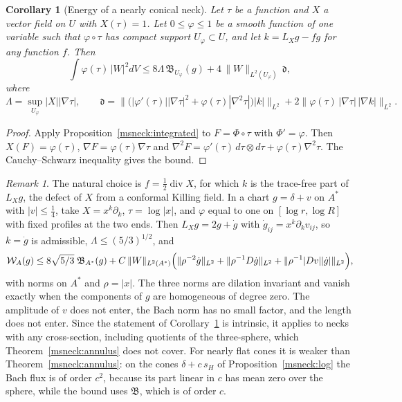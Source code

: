 \documentclass[11pt]{article}
\numberwithin{equation}{section}
\newtheorem{corollary}[theorem]{Corollary}
\theoremstyle{definition}
\theoremstyle{remark}
\newtheorem{remark}[theorem]{Remark}
\begin{document}
\begin{corollary}[Energy of a nearly conical neck]\label{msneck:neck}
Let \(\tau\) be a function and \(X\) a vector field on \(U\) with
\(X(\tau)=1\). Let \(0\le\varphi\le1\) be a smooth function of one
variable such that \(\varphi\circ\tau\) has compact support
\(U_\varphi\subset U\), and let \(k=L_Xg-fg\) for any function \(f\). Then
\[
 \int\varphi(\tau)\,|W|^2dV\le8\Lambda\,\mathfrak B_{U_\varphi}(g)
 +4\,\|W\|_{L^2(U_\varphi)}\,\mathfrak d,
\]
where
\[
 \Lambda=\sup_{U_\varphi}|X||\nabla\tau|,\qquad
 \mathfrak d=\bigl\|\bigl(|\varphi'(\tau)||\nabla\tau|^2+\varphi(\tau)|\nabla^2\tau|\bigr)|k|\bigr\|_{L^2}
 +2\bigl\|\varphi(\tau)\,|\nabla\tau|\,|\nabla k|\bigr\|_{L^2}.
\]
\end{corollary}

\begin{proof}
Apply Proposition~\ref{msneck:integrated} to \(F=\Phi\circ\tau\) with
\(\Phi'=\varphi\). Then \(X(F)=\varphi(\tau)\), \(\nabla F=\varphi(\tau)\nabla\tau\)
and \(\nabla^2F=\varphi'(\tau)\,d\tau\otimes d\tau+\varphi(\tau)\nabla^2\tau\).
The Cauchy--Schwarz inequality gives the bound.
\end{proof}

\begin{remark}\label{msneck:neck-remark}
The natural choice is \(f=\tfrac12\operatorname{div}X\), for which \(k\) is
the trace-free part of \(L_Xg\), the defect of \(X\) from a conformal
Killing field. In a chart \(g=\delta+v\) on \(A^*\) with \(|v|\le\tfrac14\),
take \(X=x^k\partial_k\), \(\tau=\log|x|\), and \(\varphi\) equal to one on
\([\log r,\log R]\) with fixed profiles at the two ends. Then
\(L_Xg=2g+\dot g\) with \(\dot g_{ij}=x^k\partial_kv_{ij}\), so \(k=\dot g\)
is admissible, \(\Lambda\le(5/3)^{1/2}\), and
\[
 \mathcal W_A(g)\le8\sqrt{5/3}\;\mathfrak B_{A^*}(g)+C\,\|W\|_{L^2(A^*)}
 \Bigl(\|\rho^{-2}\dot g\|_{L^2}+\|\rho^{-1}D\dot g\|_{L^2}
 +\|\rho^{-1}|Dv||\dot g|\|_{L^2}\Bigr),
\]
with norms on \(A^*\) and \(\rho=|x|\). The three norms are dilation
invariant and vanish exactly when the components of \(g\) are homogeneous
of degree zero. The amplitude of \(v\) does not enter, the Bach norm has
no small factor, and the length does not enter. Since the statement of
Corollary~\ref{msneck:neck} is intrinsic, it applies to necks with any
cross-section, including quotients of the three-sphere, which
Theorem~\ref{msneck:annulus} does not cover. For nearly flat cones it is
weaker than Theorem~\ref{msneck:annulus}: on the cones
\(\delta+c\,s_H\) of Proposition~\ref{msneck:log} the Bach flux is of
order \(c^2\), because its part linear in \(c\) has mean zero over the
sphere, while the bound uses \(\mathfrak B\), which is of order \(c\).
\end{remark}
\end{document}
